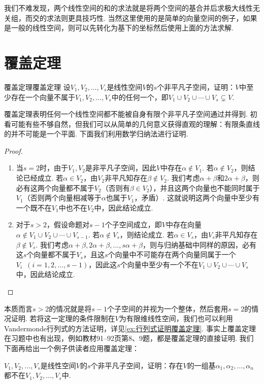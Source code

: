 我们不难发现，两个线性空间的和的求法就是将两个空间的基合并后求极大线性无关组，而交的求法则更具技巧性. 当然这里使用的是简单的向量空间的例子，如果是一般的线性空间，则可以先转化为基下的坐标然后使用上面的方法求解.

\section{覆盖定理}

\begin{theorem}{覆盖定理}{覆盖定理} 
    设$V_1,V_2,\ldots,V_s$是线性空间$V$的$s$个非平凡子空间，证明：$V$中至少存在一个向量不属于$V_1,V_2,\ldots,V_s$中的任何一个，即$V_1 \cup V_2 \cup \cdots \cup V_s\subsetneq V$.
\end{theorem}

覆盖定理表明任何一个线性空间都不能被自身有限个非平凡子空间通过并得到. 初看可能有些不够自然，但我们可以从简单的几何意义获得直观的理解：有限条直线的并不可能是一个平面. 下面我们利用数学归纳法进行证明.

\begin{proof}
    \begin{enumerate}
        \item 当$s=2$时，由于$V_1,V_2$是非平凡子空间，因此$V$中存在$\alpha\notin V_1$. 若$\alpha\notin V_2$，则结论已经成立. 若$\alpha\in V_2$，由$V_2$非平凡知存在$\beta\notin V_2$. 我们考虑$\alpha+\beta$和$2\alpha+\beta$，则必有这两个向量都不属于$V_2$（否则有$\beta\in V_2$），并且这两个向量也不能同时属于$V_1$（否则两个向量相减等于$\alpha$也属于$V_1$，矛盾）. 这就说明这两个向量中至少有一个既不在$V_1$中也不在$V_2$中，因此结论成立.

        \item 对于$s>2$，假设命题对$s-1$个子空间成立，即$V$中存在向量$\alpha\notin V_1\cup V_2\cup\cdots\cup V_{s-1}$. 若$\alpha\notin V_s$，则结论成立. 若$\alpha\in V_s$，由$V_s$非平凡知存在$\beta\notin V_s$. 我们考虑$\alpha+\beta,2\alpha+\beta,\ldots,s\alpha+\beta$，则与归纳基础中同样的原因，必有这$s$个向量都不属于$V_s$，且这$s$个向量中不可能存在两个向量同属于一个$V_i\enspace(i=1,2,\ldots,s-1)$，因此这$s$个向量中至少有一个不在$V_1\cup V_2\cup\cdots\cup V_s$中，因此结论成立.
    \end{enumerate}
\end{proof}

本质而言$s>2$的情况就是将$s-1$个子空间的并视为一个整体，然后套用$s=2$的情况证明. 若将这一定理的条件限制在$V$为有限维线性空间，我们也可以利用Vandermonde行列式的方法证明，详见\autoref{ex:行列式证明覆盖定理}. 事实上覆盖定理在习题中也有出现，例如教材91--92页第8、9题，都是覆盖定理的直接证明. 我们下面再给出一个例子供读者应用覆盖定理：
\begin{example}{}{}
    $V_1,V_2,\ldots,V_s$是线性空间$V$的$s$个非平凡子空间，证明：存在$V$的一组基$\alpha_1,\alpha_2,\ldots,\alpha_n$都不在$V_1,V_2,\ldots,V_s$中.
\end{example}

